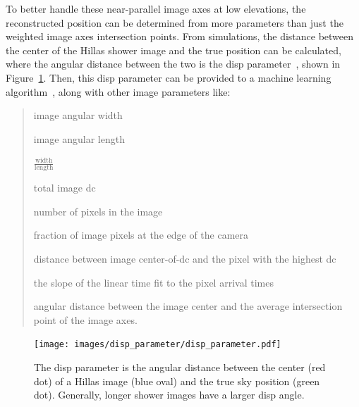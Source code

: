 To better handle these near-parallel image axes at low elevations, the reconstructed position can be determined from more parameters than just the weighted image axes intersection points.
From simulations, the distance between the center of the Hillas shower image and the true position can be calculated, where the angular distance between the two is the disp parameter~\cite{Senturk:2011}, shown in Figure~\ref{fig:dispdiagram}.
Then, this disp parameter can be provided to a machine learning algorithm~\cite{Beilicke2012NIM}, along with other image parameters like:
\begin{quote}
  \begin{description}[noitemsep]
    \item [width:] image angular width
    \item [length:] image angular length
    \item [wol:] $\frac{\textrm{width}}{\textrm{length}}$
    \item [size:] total image dc
    \item [ntubes:] number of pixels in the image
    \item [loss:] fraction of image pixels at the edge of the camera
    \item [asym:] distance between image center-of-dc and the pixel with the highest dc
    \item [tgrad:] the slope of the linear time fit to the pixel arrival times
    \item [cross:] angular distance between the image center and the average intersection point of the image axes.
  \end{description}
\end{quote}


\begin{figure}[t]
  \centering
  \texttt{[image: images/disp\_parameter/disp\_parameter.pdf]}
  \caption[Angular Reconstruction Disp]{
    The disp parameter is the angular distance between the center (red dot) of a Hillas image (blue oval) and the true sky position (green dot).
    Generally, longer shower images have a larger disp angle.
  }
  \label{fig:dispdiagram}
\end{figure}

